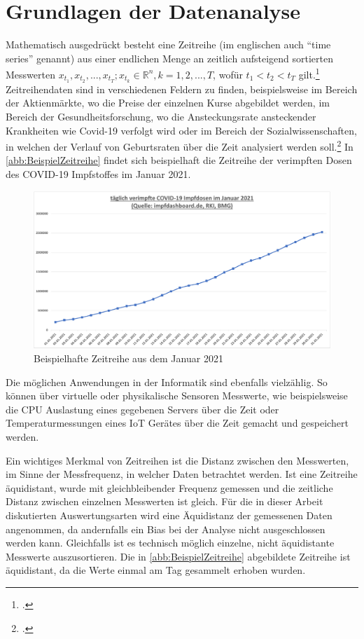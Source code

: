 \section{Grundlagen der Datenanalyse}\label{chap:GrundlagenDatenanalyse}

Mathematisch ausgedrückt besteht eine Zeitreihe (im englischen auch \enquote{time series} genannt) aus einer endlichen Menge an zeitlich aufsteigend sortierten Messwerten $x_{t_1},x_{t_2},...,x_{t_T};  x_{t_k} \in \mathbb{R}^n, k=1,2,...,T$, wofür $t_1 < t_2 < t_T $ gilt.\footcite[Vgl.][1]{Deistler.2018b} Zeitreihendaten sind in verschiedenen Feldern zu finden, beispielsweise im Bereich der Aktienmärkte, wo die Preise der einzelnen Kurse abgebildet werden, im Bereich der Gesundheitsforschung, wo die Ansteckungsrate ansteckender Krankheiten wie Covid-19 verfolgt wird oder im Bereich der Sozialwissenschaften, in welchen der Verlauf von Geburtsraten über die Zeit analysiert werden soll.\footcite[Vgl.][1]{Shumway.2017b} In \autoref{abb:BeispielZeitreihe} findet sich beispielhaft die Zeitreihe der verimpften Dosen des COVID-19 Impfstoffes im Januar 2021.

\begin{figure}[H]
\centering
\includegraphics[width=\textwidth]{graphics/Beispiel-Zeitreihe.pdf}
\caption{Beispielhafte Zeitreihe aus dem Januar 2021}
\label{abb:BeispielZeitreihe}
\end{figure}

Die möglichen Anwendungen in der Informatik sind ebenfalls vielzählig. So können über virtuelle oder physikalische Sensoren Messwerte, wie beispielsweise die CPU Auslastung eines gegebenen Servers über die Zeit oder Temperaturmessungen eines \ac{IoT} Gerätes über die Zeit gemacht und gespeichert werden.

Ein wichtiges Merkmal von Zeitreihen ist die Distanz zwischen den Messwerten, im Sinne der Messfrequenz, in welcher Daten betrachtet werden.  Ist eine Zeitreihe äquidistant, wurde mit gleichbleibender Frequenz gemessen und die zeitliche Distanz zwischen einzelnen Messwerten ist gleich. Für die in dieser Arbeit diskutierten Auswertungsarten wird eine Äquidistanz der gemessenen Daten angenommen, da andernfalls ein Bias bei der Analyse nicht ausgeschlossen werden kann. Gleichfalls ist es technisch möglich einzelne, nicht äquidistante Messwerte auszusortieren. Die in \autoref{abb:BeispielZeitreihe} abgebildete Zeitreihe ist äquidistant, da die Werte einmal am Tag gesammelt erhoben wurden.


